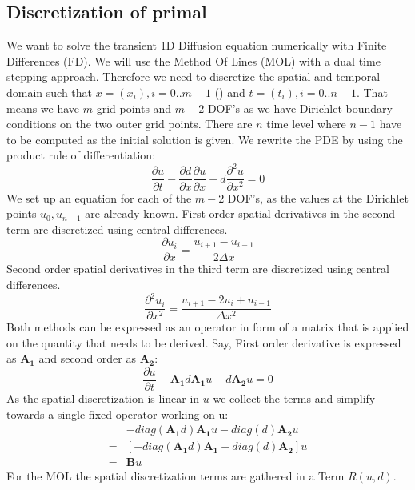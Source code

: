 \documentclass[10pt]{article}
\begin{document}
\subsection{Discretization of primal}
We want to solve the transient 1D Diffusion equation numerically with Finite Differences (FD). We will use the Method Of Lines (MOL) with a dual time stepping approach. Therefore we need to discretize the spatial and temporal domain such that $x=(x_i), i=0..m-1$ () and $t=(t_i), i=0 .. n-1$. That means we have $m$ grid points and $m-2$ DOF's as we have Dirichlet boundary conditions on the two outer grid points. There are $n$ time level where $n-1$ have to be computed as the initial solution is given. We rewrite the PDE by using the product rule of differentiation:
\begin{equation}
\frac{\partial u}{\partial t} - \frac{\partial d}{\partial x}\frac{\partial u}{\partial x} -d \frac{\partial^2 u}{\partial x^2}  = 0
\end{equation}
We set up an equation for each of the $m-2$ DOF's, as the values at the Dirichlet points $u_0, u_{n-1}$ are already known. First order spatial derivatives in the second term are discretized using central differences.
\begin{equation}
\frac{\partial u_i}{\partial x} = \frac{u_{i+1} - u_{i-1}}{2\Delta x}
\end{equation}
Second order spatial derivatives in the third term are discretized using central differences.
\begin{equation}
\frac{\partial^2 u_i}{\partial x^2} = \frac{u_{i+1} - 2 u_{i} + u_{i-1}}{\Delta x^2}
\end{equation}
Both methods can be expressed as an operator in form of a matrix that is applied on the quantity that needs to be derived. Say, First order derivative is expressed as $\mathbf{A_1}$ and second order as $\mathbf{A_2}$:
\begin{equation}
\frac{\partial u}{\partial t} - \mathbf{A_1}d\mathbf{A_1}u - d \mathbf{A_2}u = 0
\end{equation}
As the spatial discretization is linear in $u$ we collect the terms and simplify towards a single fixed operator working on u:
\begin{align}
&-diag(\mathbf{A_1}d)\mathbf{A_1}u - diag(d) \mathbf{A_2}u \\
=&\left[ -diag(\mathbf{A_1}d)\mathbf{A_1} - diag(d) \mathbf{A_2} \right]u \\
=& \mathbf{B}u
\end{align}
For the MOL the spatial discretization terms are gathered in a Term $R(u,d)$.
\end{document}
